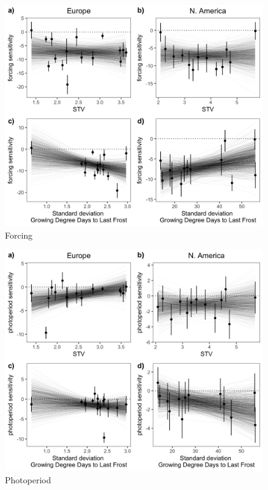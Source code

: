 \documentclass[12pt]{article}
\begin{document}
\begin{figure}[h!]
    \centering
 \includegraphics[width=\textwidth]{..//..//analyses/ranges/figures/contz_force.jpeg} 
    \caption{Forcing}
    \label{fig:force}
\end{figure}

\begin{figure}[h!]
    \centering
 \includegraphics[width=\textwidth]{..//..//analyses/ranges/figures/contz_photo.jpeg} 
    \caption{Photoperiod}
    \label{fig:photo}
\end{figure}
\end{document}
